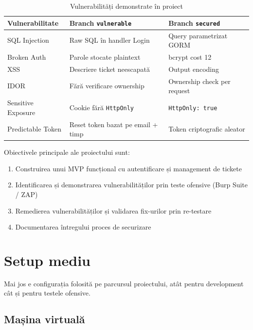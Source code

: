\documentclass[12pt]{article}
\begin{document}
\begin{table}[H]
\centering
\begin{tabular}{|l|l|l|}
\hline
\textbf{Vulnerabilitate} & \textbf{Branch \texttt{vulnerable}} & \textbf{Branch \texttt{secured}} \\
\hline
SQL Injection        & Raw SQL în handler Login                    & Query parametrizat GORM \\
Broken Auth          & Parole stocate plaintext                    & bcrypt cost 12 \\
XSS                  & Descriere ticket neescapată                 & Output encoding \\
IDOR                 & Fără verificare ownership                   & Ownership check per request \\
Sensitive Exposure   & Cookie fără \texttt{HttpOnly}              & \texttt{HttpOnly: true} \\
Predictable Token    & Reset token bazat pe email + timp           & Token criptografic aleator \\
\hline
\end{tabular}
\caption{Vulnerabilități demonstrate în proiect}
\end{table}

Obiectivele principale ale proiectului sunt:
\begin{enumerate}
    \item Construirea unui MVP funcțional cu autentificare și management de tickete
    \item Identificarea și demonstrarea vulnerabilităților prin teste ofensive (Burp Suite / ZAP)
    \item Remedierea vulnerabilităților și validarea fix-urilor prin re-testare
    \item Documentarea întregului proces de securizare
\end{enumerate}

\newpage
\section{Setup mediu}

Mai jos e configurația folosită pe parcursul proiectului, atât pentru development cât și pentru testele ofensive.

\subsection{Mașina virtuală}
\end{document}
